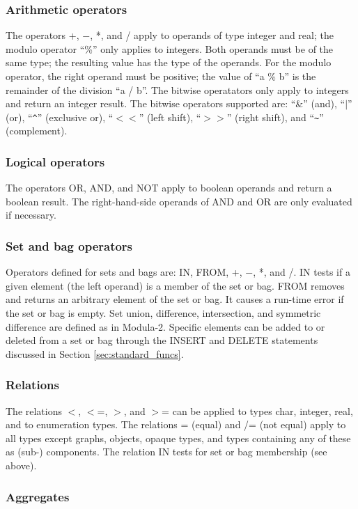 \documentclass[10pt]{article}
\begin{document}
\subsubsection{Arithmetic operators}

The operators +, $-$, *, and / apply to operands of type integer and real;
the modulo operator ``\%'' only applies to integers.
Both operands must be of the same type; the resulting value has the
type of the operands.
For the modulo operator, the right operand must be positive; the value
of ``a \% b'' is the remainder of the division ``a / b''.
The bitwise operatators only apply to integers and return an integer result.
The bitwise operators supported are: ``\&'' (and), ``$|$'' (or), ``\verb+^+''
(exclusive or), ``$<<$'' (left shift), ``$>>$'' (right shift),
and ``\verb+~+'' (complement).
\subsubsection{Logical operators}

The operators OR, AND, and NOT apply to boolean operands and return
a boolean result.
The right-hand-side operands of AND and OR are only evaluated if
necessary.
\subsubsection{Set and bag operators}

Operators defined for sets and bags are:
IN, FROM, +, $-$, *, and /.
IN tests if a given element (the left operand) is a member of the set or bag.
FROM removes and returns an arbitrary element of the set or bag.
It causes a run-time error if the set or bag is empty.
Set union, difference, intersection, and symmetric difference are defined
as in Modula-2.
Specific elements can be added to or deleted from a set or bag through the
INSERT and DELETE statements discussed in Section \ref{sec:standard_funcs}.
\subsubsection{Relations}\label{sec:relations}

The relations $<$, $<$=, $>$, and $>$= can be applied to
types char, integer, real, and to enumeration types.
The relations = (equal) and /= (not equal) apply to all types
except graphs, objects, opaque types, and types containing any
of these as (sub-) components.
The relation IN tests for set or bag membership (see above).
\subsubsection{Aggregates}
\end{document}
